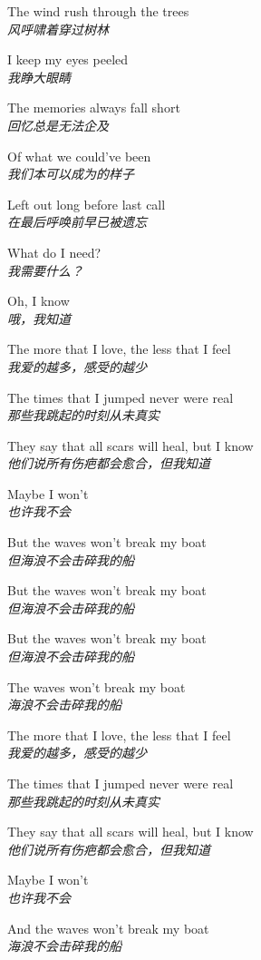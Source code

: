 \begin{spacing}{1.5}
\begin{flushleft}
The wind rush through the trees\\
\textit{风呼啸着穿过树林}\lyricspace

I keep my eyes peeled\\
\textit{我睁大眼睛}\lyricspace

The memories always fall short\\
\textit{回忆总是无法企及}\lyricspace

Of what we could've been\\
\textit{我们本可以成为的样子}\lyricspace

Left out long before last call\\
\textit{在最后呼唤前早已被遗忘}\lyricspace

What do I need?\\
\textit{我需要什么？}\lyricspace

Oh, I know\\
\textit{哦，我知道}\lyricspace

The more that I love, the less that I feel\\
\textit{我爱的越多，感受的越少}\lyricspace

The times that I jumped never were real\\
\textit{那些我跳起的时刻从未真实}\lyricspace

They say that all scars will heal, but I know\\
\textit{他们说所有伤疤都会愈合，但我知道}\lyricspace

Maybe I won't\\
\textit{也许我不会}\lyricspace

But the waves won't break my boat\\
\textit{但海浪不会击碎我的船}\lyricspace

But the waves won't break my boat\\
\textit{但海浪不会击碎我的船}\lyricspace

But the waves won't break my boat\\
\textit{但海浪不会击碎我的船}\lyricspace

The waves won't break my boat\\
\textit{海浪不会击碎我的船}\lyricspace

The more that I love, the less that I feel\\
\textit{我爱的越多，感受的越少}\lyricspace

The times that I jumped never were real\\
\textit{那些我跳起的时刻从未真实}\lyricspace

They say that all scars will heal, but I know\\
\textit{他们说所有伤疤都会愈合，但我知道}\lyricspace

Maybe I won't\\
\textit{也许我不会}\lyricspace

And the waves won't break my boat\\
\textit{海浪不会击碎我的船}\lyricspace
\end{flushleft}
\end{spacing} 

